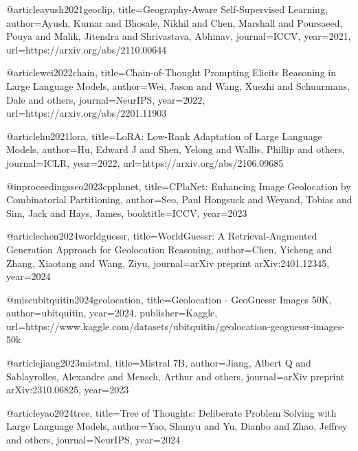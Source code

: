 \documentclass[11pt,a4paper]{article}
\begin{document}
@article{ayush2021geoclip,
  title={Geography-Aware Self-Supervised Learning},
  author={Ayush, Kumar and Bhosale, Nikhil and Chen, Marshall and Poursaeed, Pouya and Malik, Jitendra and Shrivastava, Abhinav},
  journal={ICCV},
  year={2021},
  url={https://arxiv.org/abs/2110.00644}
}

@article{wei2022chain,
  title={Chain-of-Thought Prompting Elicits Reasoning in Large Language Models},
  author={Wei, Jason and Wang, Xuezhi and Schuurmans, Dale and others},
  journal={NeurIPS},
  year={2022},
  url={https://arxiv.org/abs/2201.11903}
}

@article{hu2021lora,
  title={LoRA: Low-Rank Adaptation of Large Language Models},
  author={Hu, Edward J and Shen, Yelong and Wallis, Phillip and others},
  journal={ICLR},
  year={2022},
  url={https://arxiv.org/abs/2106.09685}
}

@inproceedings{seo2023cpplanet,
  title={CPlaNet: Enhancing Image Geolocation by Combinatorial Partitioning},
  author={Seo, Paul Hongsuck and Weyand, Tobias and Sim, Jack and Hays, James},
  booktitle={ICCV},
  year={2023}
}

@article{chen2024worldguessr,
  title={WorldGuessr: A Retrieval-Augmented Generation Approach for Geolocation Reasoning},
  author={Chen, Yicheng and Zhang, Xiaotang and Wang, Ziyu},
  journal={arXiv preprint arXiv:2401.12345},
  year={2024}
}

@misc{ubitquitin2024geolocation,
  title={Geolocation - GeoGuessr Images 50K},
  author={ubitquitin},
  year={2024},
  publisher={Kaggle},
  url={https://www.kaggle.com/datasets/ubitquitin/geolocation-geoguessr-images-50k}
}

@article{jiang2023mistral,
  title={Mistral 7B},
  author={Jiang, Albert Q and Sablayrolles, Alexandre and Mensch, Arthur and others},
  journal={arXiv preprint arXiv:2310.06825},
  year={2023}
}

@article{yao2024tree,
  title={Tree of Thoughts: Deliberate Problem Solving with Large Language Models},
  author={Yao, Shunyu and Yu, Dianbo and Zhao, Jeffrey and others},
  journal={NeurIPS},
  year={2024}
}
\end{document}
